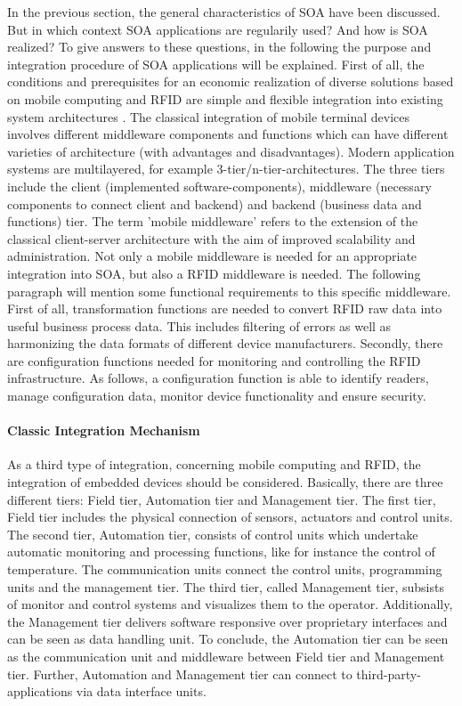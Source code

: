 In the previous section, the general characteristics of SOA have been discussed. But in which context SOA applications are regularily used? And how is SOA realized? To give answers to these questions, in the following the purpose and integration procedure of SOA applications will be explained. 
First of all, the conditions and prerequisites for an economic realization of diverse solutions based on mobile computing and RFID are simple and flexible integration into existing system architectures \cite[p.133 ff.]{mobile}. The classical integration of mobile terminal devices involves different middleware components and functions which can have different varieties of architecture (with advantages and disadvantages). Modern application systems are multilayered, for example 3-tier/n-tier-architectures. The three tiers include the client (implemented software-components), middleware (necessary components to connect client and backend) and backend (business data and functions) tier. The term 'mobile middleware' refers to the extension of the classical client-server architecture with the aim of improved scalability and administration.
Not only a mobile middleware is needed for an appropriate integration into SOA, but also a RFID middleware is needed. The following paragraph will mention some functional requirements to this specific middleware. First of all, transformation functions are needed to convert RFID raw data into useful business process data. This includes filtering of errors as well as harmonizing the data formats of different device manufacturers. Secondly, there are configuration functions needed for monitoring and controlling the RFID infrastructure. As follows, a configuration function is able to identify readers, manage configuration data, monitor device functionality and ensure security.  

\paragraph{Classic Integration Mechanism}

As a third type of integration, concerning mobile computing and RFID, the integration of embedded devices should be considered. Basically, there are three different tiers: Field tier, Automation tier and Management tier. The first tier, Field tier includes the physical connection of sensors, actuators and control units. The second tier, Automation tier, consists of control units which undertake automatic monitoring and processing functions, like for instance the control of temperature. The communication units connect the control units, programming units and the management tier. The third tier, called Management tier, subsists of monitor and control systems and visualizes them to the operator. Additionally, the Management tier delivers software responsive over proprietary interfaces and can be seen as data handling unit. 
To conclude, the Automation tier can be seen as the communication unit and middleware between Field tier and Management tier. Further, Automation and Management tier can connect to third-party-applications via data interface units.
 
